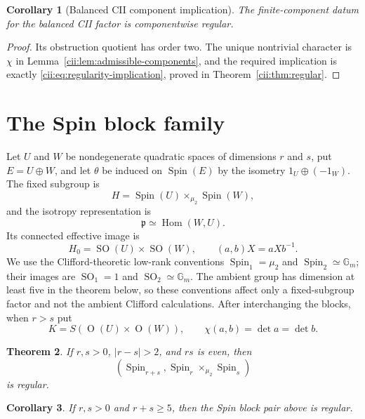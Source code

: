\documentclass[10pt,a4paper]{amsart}
\numberwithin{equation}{section}
\newtheorem{theorem}{Theorem}[section]
\newtheorem{corollary}[theorem]{Corollary}
\newcommand{\Gm}{\mathbb G_m}
\newcommand{\Spin}{\operatorname{Spin}}
\newcommand{\SO}{\operatorname{SO}}
\newcommand{\Or}{\operatorname{O}}
\newcommand{\Hom}{\operatorname{Hom}}
\newcommand{\fp}{\mathfrak p}
\begin{document}
\begin{corollary}[Balanced CII component implication]\label{cor:CII-component}
The finite-component datum for the balanced CII factor is componentwise
regular.
\end{corollary}

\begin{proof}
Its obstruction quotient has order two.  The unique nontrivial character is
$\chi$ in Lemma~\ref{cii:lem:admissible-components}, and the required implication
is exactly \eqref{cii:eq:regularity-implication}, proved in
Theorem~\ref{cii:thm:regular}.
\end{proof}

\section{The Spin block family}\label{sec:Spin-family}

Let $U$ and $W$ be nondegenerate quadratic spaces of dimensions $r$ and $s$,
put $E=U\oplus W$, and let $\theta$ be induced on $\Spin(E)$ by the isometry
$1_U\oplus(-1_W)$.  The fixed subgroup is
\[
 H=\Spin(U)\times_{\mu_2}\Spin(W),
\]
and the isotropy representation is
\begin{equation}\label{spin:eq:p-intro}
 \fp\simeq\Hom(W,U).
\end{equation}
Its connected effective image is
\begin{equation}\label{spin:eq:H0-action-intro}
 H_0=\SO(U)\times\SO(W),
 \qquad (a,b)X=aXb^{-1}.
\end{equation}
We use the Clifford-theoretic low-rank conventions
$\Spin_1=\mu_2$ and $\Spin_2\simeq\Gm$; their images are
$\SO_1=1$ and $\SO_2\simeq\Gm$.  The ambient group has dimension at
least five in the theorem below, so these conventions affect only a
fixed-subgroup factor and not the ambient Clifford calculations.
After interchanging the blocks, when $r>s$ put
\begin{equation}\label{spin:eq:Kchi-intro}
 K=S(\Or(U)\times\Or(W)),\qquad
 \chi(a,b)=\det a=\det b.
\end{equation}

\begin{theorem}\label{thm:Spin-residual}
If $r,s>0$, $|r-s|>2$, and $rs$ is even, then
\[
 (\Spin_{r+s},\Spin_r\times_{\mu_2}\Spin_s)
\]
is regular.
\end{theorem}

\begin{corollary}\label{cor:Spin-all}
If $r,s>0$ and $r+s\ge5$, then the Spin block pair above is regular.
\end{corollary}
\end{document}
